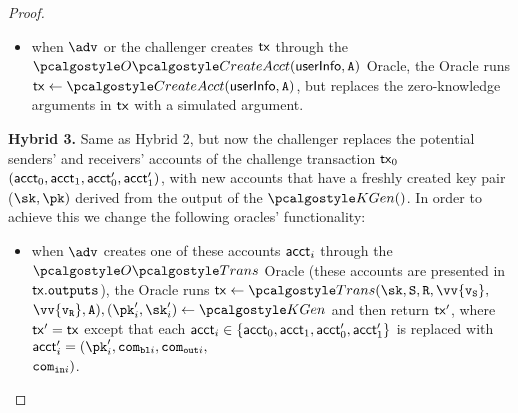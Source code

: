 \begin{proof}
\begin{itemize}
    \item when $\adv$ or the challenger creates $\textup{\textsf{tx}}$ through the $\createAcctOracle(\userinfo, \anset)$ Oracle, the Oracle runs $\txn \gets \createAcct(\userinfo, \anset)$, but replaces the zero-knowledge arguments in $\textup{\textsf{tx}}$ with a simulated argument.\\
\end{itemize}
% 
\textbf{Hybrid 3.} Same as Hybrid 2, but now the challenger replaces the potential senders' and receivers' accounts of the challenge transaction $\textup{\textsf{tx}}_0$ $(\textup{\textsf{acct}}_0, \textup{\textsf{acct}}_1, \textup{\textsf{acct}}_0^\prime, \textup{\textsf{acct}}_1^\prime)$, with new accounts that have a freshly created key pair ($\sk, \pk)$ derived from the output of the $\kgen()$. 
In order to achieve this we change the following oracles' functionality:
\begin{itemize} 
    \item when $\adv$ creates one of these accounts $\textup{\textsf{acct}}_i$ through the $\transOracle$ Oracle (these accounts are presented in $\textup{\textsf{tx}}.{\textup{\texttt{outputs}}}$), the Oracle runs $\txn \gets \trans(\sk,\sset, \rset, \vv{\v_\sset},$ \\ $ \vv{\v_\rset}, \anset), (\pk_i^\prime, \sk_i^\prime) \gets \kgen$ and then return $\textup{\textsf{tx}}^\prime$, where $\textup{\textsf{tx}}^\prime = \textup{\textsf{tx}}$ except that each $\textup{\textsf{acct}}_i \in \{\textup{\textsf{acct}}_0, \textup{\textsf{acct}}_1, \textup{\textsf{acct}}_0^\prime, \textup{\textsf{acct}}_1^\prime\}$ is replaced with $\acct_i^\prime = (\pk_i^\prime, \com_{\varbl i}, \com_{\varout i},$ \\ $ \texttt{com}_{\textup{\texttt{{in}}} i})$.\\
    

\end{itemize}
\end{proof}
